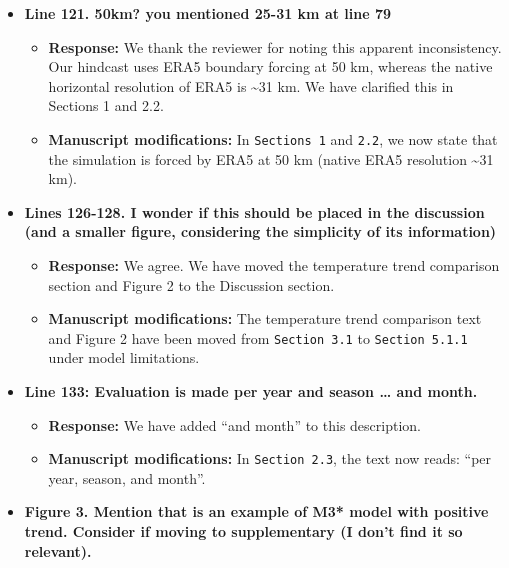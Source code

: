 \documentclass[
  letterpaper,
  DIV=11,
  numbers=noendperiod]{scrartcl}
\providecommand{\tightlist}{%
  \setlength{\itemsep}{0pt}\setlength{\parskip}{0pt}}\usepackage{longtable,booktabs,array}
\begin{document}
\begin{itemize}
  \begin{itemize}
  \tightlist
  \item
    \textbf{Response:} We agree. We have rephrased the text to emphasize
    the high computational cost of long CPM simulations, which makes our
    63-year hindcast particularly valuable.
  \item
    \textbf{Manuscript modifications:} In \texttt{Section\ 1}, we have
    updated the text to: ``conducting multi-decadal hindcasts is
    computationally challenging for CPMs, which makes our 63-year
    simulation particularly valuable''.
  \end{itemize}
\item
  \textbf{Line 121. 50km? you mentioned 25-31 km at line 79}

  \begin{itemize}
  \tightlist
  \item
    \textbf{Response:} We thank the reviewer for noting this apparent
    inconsistency. Our hindcast uses ERA5 boundary forcing at 50 km,
    whereas the native horizontal resolution of ERA5 is
    \textasciitilde31 km. We have clarified this in Sections 1 and 2.2.
  \item
    \textbf{Manuscript modifications:} In \texttt{Sections\ 1} and
    \texttt{2.2}, we now state that the simulation is forced by ERA5 at
    50 km (native ERA5 resolution \textasciitilde31 km).
  \end{itemize}
\item
  \textbf{Lines 126-128. I wonder if this should be placed in the
  discussion (and a smaller figure, considering the simplicity of its
  information)}

  \begin{itemize}
  \tightlist
  \item
    \textbf{Response:} We agree. We have moved the temperature trend
    comparison section and Figure 2 to the Discussion section.
  \item
    \textbf{Manuscript modifications:} The temperature trend comparison
    text and Figure 2 have been moved from \texttt{Section\ 3.1} to
    \texttt{Section\ 5.1.1} under model limitations.
  \end{itemize}
\item
  \textbf{Line 133: Evaluation is made per year and season \ldots{} and
  month.}

  \begin{itemize}
  \tightlist
  \item
    \textbf{Response:} We have added ``and month'' to this description.
  \item
    \textbf{Manuscript modifications:} In \texttt{Section\ 2.3}, the
    text now reads: ``per year, season, and month''.
  \end{itemize}
\item
  \textbf{Figure 3. Mention that is an example of M3* model with
  positive trend. Consider if moving to supplementary (I don't find it
  so relevant).}


\end{itemize}
\end{document}
